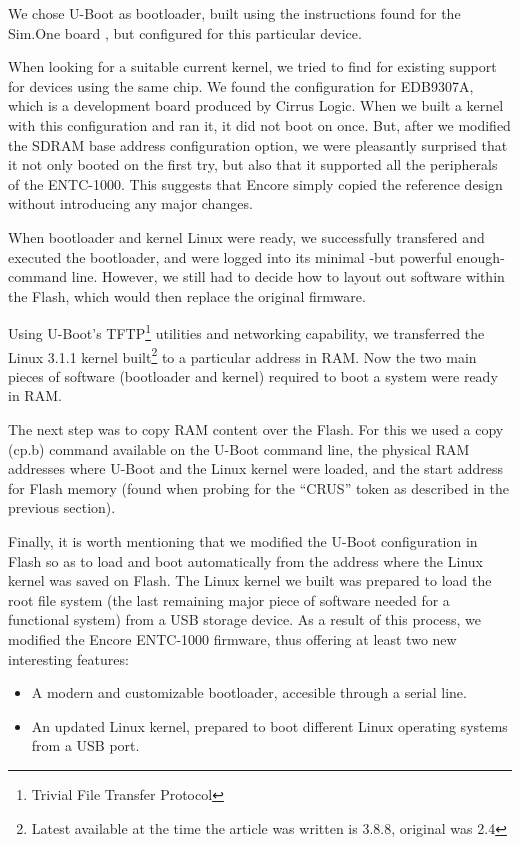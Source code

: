 \documentclass[conference]{IEEEtran}
\begin{document}
We chose U-Boot as bootloader, built 
using the instructions found for the Sim.One board \cite{sim1},
but configured for this particular device.

When looking for a suitable current kernel, we tried to find for existing support
for devices using the same chip. We found the configuration for EDB9307A,
which is a development board produced by Cirrus Logic.
When we built a kernel with this configuration and ran it, it did not boot on once.
But, after we modified the SDRAM base address configuration option, we were
pleasantly surprised that it not only booted on the first try, but also that it supported all
the peripherals of the ENTC-1000.
This suggests that Encore simply copied the reference design without introducing any major changes.

When bootloader and kernel Linux were ready, we successfully
transfered and executed the bootloader, and were
logged into its minimal -but powerful enough- command line.
However, we still had to decide how to layout out software within
the Flash, which would then replace the original firmware.

Using U-Boot's TFTP\footnote{Trivial File Transfer Protocol} utilities and networking capability, we
transferred the Linux 3.1.1 kernel built\footnote{Latest available at the time the article was written is 3.8.8, original was 2.4} to a particular address in RAM.
Now the two main pieces of software (bootloader and kernel) required to boot a system
were ready in RAM.

The next step was to copy RAM content over the Flash.
For this we used a copy (cp.b) command available on the U-Boot command line, the physical RAM addresses where U-Boot and the Linux kernel were loaded, and the start address for Flash memory (found when probing for the “CRUS” token as described in the previous section).

Finally, it is worth mentioning that we modified the U-Boot configuration in Flash so as to load and boot automatically from the 
address where the Linux kernel was saved on Flash. The Linux kernel we built was prepared to load the root file 
system (the last remaining major piece of software needed for a functional 
system) from a USB storage device. 
As a result of this process, we modified the Encore
ENTC-1000 firmware, thus offering at least two new interesting features:

\begin{itemize}
\item A modern and customizable bootloader, accesible through a serial line.
\item An updated Linux kernel, prepared to boot different
   Linux operating systems from a USB port.
\end{itemize}
\end{document}
